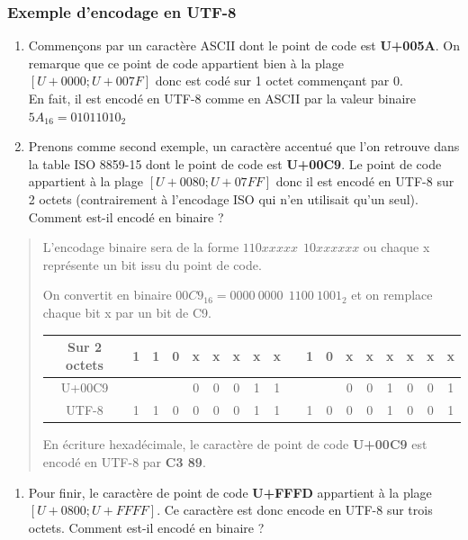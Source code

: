 \documentclass[11pt]{article}
\providecommand{\tightlist}{%
      \setlength{\itemsep}{0pt}\setlength{\parskip}{0pt}}
\begin{document}
\hypertarget{exemple-dencodage-en-utf-8}{%
\subsubsection*{Exemple d'encodage en
UTF-8}\label{exemple-dencodage-en-utf-8}}

\begin{enumerate}
\def\labelenumi{\arabic{enumi}.}
\item
  Commençons par un caractère ASCII dont le point de code est
  \textbf{U+005A}. On remarque que ce point de code appartient bien à la
  plage \([U+0000 ; U+007F]\) donc est codé sur 1 octet commençant par
  \(0\).\\
  En fait, il est encodé en UTF-8 comme en ASCII par la valeur binaire
  \(5A_{16} = 0101 1010_{2}\)
\item
  Prenons comme second exemple, un caractère accentué que l'on retrouve
  dans la table ISO 8859-15 dont le point de code est \textbf{U+00C9}.
  Le point de code appartient à la plage \([U+0080; U+07FF]\) donc il
  est encodé en UTF-8 sur 2 octets (contrairement à l'encodage ISO qui
  n'en utilisait qu'un seul). Comment est-il encodé en binaire ?
\end{enumerate}

\begin{quote}
L'encodage binaire sera de la forme \(110xxxxx~~10xxxxxx\) ou chaque x
représente un bit issu du point de code.

On convertit en binaire \(00C9_{16} = 0000~0000~~1100~1001_{2}\) et on
remplace chaque bit x par un bit de C9.

\begin{longtable}[]{@{}cccccccccccccccccc@{}}
\toprule
Sur 2 octets & 1 & 1 & 0 & x & x & x & x & x & & 1 & 0 & x & x & x & x &
x & x\tabularnewline
\midrule
\endhead
U+00C9 & & & & 0 & 0 & 0 & 1 & 1 & & & & 0 & 0 & 1 & 0 & 0 &
1\tabularnewline
UTF-8 & 1 & 1 & 0 & 0 & 0 & 0 & 1 & 1 & & 1 & 0 & 0 & 0 & 1 & 0 & 0 &
1\tabularnewline
\bottomrule
\end{longtable}

En écriture hexadécimale, le caractère de point de code \textbf{U+00C9}
est encodé en UTF-8 par \textbf{C3 89}.
\end{quote}

\begin{enumerate}
\def\labelenumi{\arabic{enumi}.}
\setcounter{enumi}{2}
\tightlist
\item
  Pour finir, le caractère de point de code \textbf{U+FFFD} appartient à
  la plage \([U+0800 ; U+FFFF]\). Ce caractère est donc encode en UTF-8
  sur trois octets. Comment est-il encodé en binaire ?
\end{enumerate}
\end{document}
